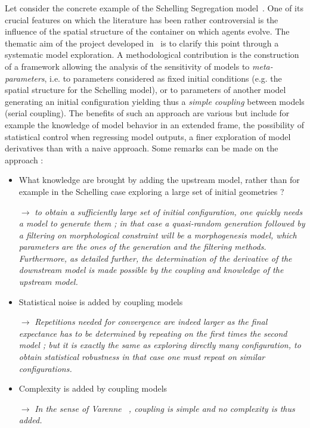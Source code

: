 Let consider the concrete example of the Schelling Segregation model~\cite{schelling1971dynamic}. 
One of its crucial features on which the literature has been rather controversial is the influence of the spatial structure of the container on which agents evolve.%
 The thematic aim of the project developed in~\cite{cottineau2015revisiting} is to clarify this point through a systematic model exploration. A methodological contribution is the construction of a framework allowing the analysis of the sensitivity of models to \emph{meta-parameters}, i.e. to parameters considered as fixed initial conditions (e.g. the spatial structure for the Schelling model), or to parameters of another model generating an initial configuration%
 yielding thus a \emph{simple coupling} between models (serial coupling). The benefits of such an approach are various but include for example the knowledge of model behavior in an extended frame, the possibility of statistical control when regressing model outputs, a finer exploration of model derivatives than with a naive approach. Some remarks can be made on the approach :
\begin{itemize}
\item What knowledge are brought by adding the upstream model, rather than for example in the Schelling case exploring a large set of initial geometries ? 

$\rightarrow$ \textit{to obtain a sufficiently large set of initial configuration, one quickly needs a model to generate them ; in that case a quasi-random generation followed by a filtering on morphological constraint will be a morphogenesis model, which parameters are the ones of the generation and the filtering methods. Furthermore, as detailed further, the determination of the derivative of the downstream model is made possible by the coupling and knowledge of the upstream model.}


\item Statistical noise is added by coupling models

$\rightarrow$ \textit{Repetitions needed for convergence are indeed larger as the final expectance has to be determined by repeating on the first times the second model ; but it is exactly the same as exploring directly many configuration, to obtain statistical robustness in that case one must repeat on similar configurations.}

\item Complexity is added by coupling models

$\rightarrow$ \textit{In the sense of Varenne~\cite{varenne2010framework} , coupling is simple and no complexity is thus added.}
\end{itemize}
 
